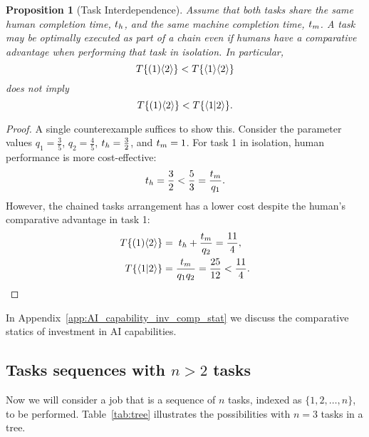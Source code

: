 \documentclass{article}
\theoremstyle{plain}
\theoremstyle{plain}
\newtheorem{proposition}[theorem]{Proposition}
\begin{document}
\begin{proposition}[Task Interdependence] \label{proposition:interdependence}
Assume that both tasks share the same human completion time, $t_{h}$, and the same machine completion time, $t_{m}$.
A task may be optimally executed as part of a chain even if humans have a comparative advantage when performing that task in isolation.
In particular,
\[
T\{ ( 1 )\langle 2 \rangle \} < T\{ \langle 1 \rangle\langle 2 \rangle \}
\]
does not imply
\[
T\{ ( 1 )\langle 2 \rangle \} < T\{ \langle 1|2 \rangle \}.
\]
\end{proposition}
\begin{proof}
A single counterexample suffices to show this.
Consider the parameter values $q_1 = \frac{3}{5}$, $q_2 = \frac{4}{5}$, $t_{h} = \frac{3}{2}$, and $t_{m} = 1$.
For task 1 in isolation, human performance is more cost-effective:
\[
t_{h} = \frac{3}{2} < \frac{5}{3} = \frac{t_{m}}{q_1}.
\]
However, the chained tasks arrangement has a lower cost despite the human's comparative advantage in task 1:
\begin{align*}
    T\{ ( 1 )\langle 2 \rangle \} &= \; t_{h} + \frac{t_{m}}{q_2} = \frac{11}{4}, \\
    T\{ \langle 1|2 \rangle \} &= \frac{t_{m}}{q_1 q_2} = \frac{25}{12} < \frac{11}{4}.
\end{align*}
\end{proof}
In Appendix~\ref{app:AI_capability_inv_comp_stat} we discuss the comparative statics of investment in AI capabilities.


\subsection{Tasks sequences with \(n > 2\) tasks}
Now we will consider a job that is a sequence of \(n\) tasks, indexed as \(\{1, 2, \ldots, n\}\), to be performed.
Table~\ref{tab:tree} illustrates the possibilities with \(n=3\) tasks in a tree.
\end{document}
